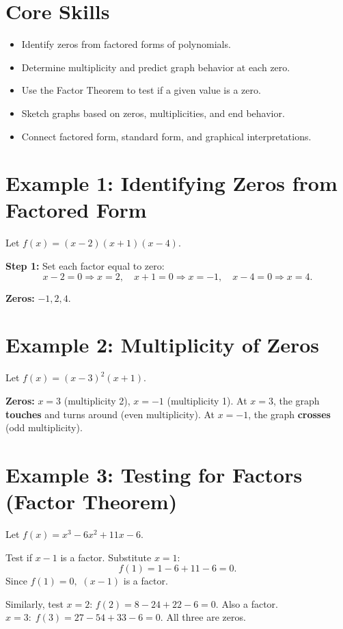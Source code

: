 \documentclass[14pt]{extarticle}
\begin{document}
\section*{Core Skills}
\begin{itemize}
  \item Identify zeros from factored forms of polynomials.
  \item Determine multiplicity and predict graph behavior at each zero.
  \item Use the Factor Theorem to test if a given value is a zero.
  \item Sketch graphs based on zeros, multiplicities, and end behavior.
  \item Connect factored form, standard form, and graphical interpretations.
\end{itemize}

\section*{Example 1: Identifying Zeros from Factored Form}

Let \(f(x) = (x - 2)(x + 1)(x - 4)\).

\textbf{Step 1:} Set each factor equal to zero:
\[
x - 2 = 0 \Rightarrow x = 2, \quad x + 1 = 0 \Rightarrow x = -1, \quad x - 4 = 0 \Rightarrow x = 4.
\]

\textbf{Zeros:} \(-1, 2, 4.\)

\section*{Example 2: Multiplicity of Zeros}

Let \(f(x) = (x - 3)^2(x + 1).\)

\textbf{Zeros:} \(x = 3\) (multiplicity 2), \(x = -1\) (multiplicity 1).  
At \(x = 3\), the graph \textbf{touches} and turns around (even multiplicity).  
At \(x = -1\), the graph \textbf{crosses} (odd multiplicity).

\section*{Example 3: Testing for Factors (Factor Theorem)}

Let \(f(x) = x^3 - 6x^2 + 11x - 6.\)

Test if \(x - 1\) is a factor. Substitute \(x = 1\):
\[
f(1) = 1 - 6 + 11 - 6 = 0.
\]
Since \(f(1) = 0,\) \((x - 1)\) is a factor.

Similarly, test \(x = 2\):  
\(f(2) = 8 - 24 + 22 - 6 = 0.\)
Also a factor.  
\(x = 3:\; f(3) = 27 - 54 + 33 - 6 = 0.\)
All three are zeros.
\end{document}

